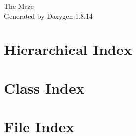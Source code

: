 \documentclass[twoside]{book}
\newcommand{\+}{\discretionary{\mbox{\scriptsize$\hookleftarrow$}}{}{}}
\newcommand{\clearemptydoublepage}{%
  \newpage{\pagestyle{empty}\cleardoublepage}%
}
\begin{document}
\hypersetup{pageanchor=false,
             bookmarksnumbered=true,
             pdfencoding=unicode
            }
\begin{titlepage}
\vspace*{7cm}
\begin{center}%
{\Large The Maze }\\
\vspace*{1cm}
{\large Generated by Doxygen 1.8.14}\\
\end{center}
\end{titlepage}
\clearemptydoublepage
{}
\tableofcontents
\clearemptydoublepage
{}
\hypersetup{pageanchor=true}

\chapter{Hierarchical Index}

\chapter{Class Index}

\chapter{File Index}

\end{document}
